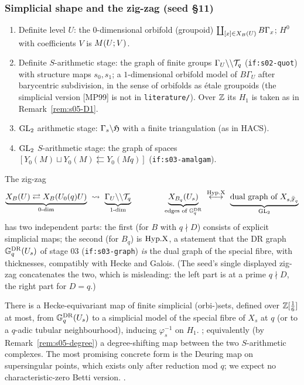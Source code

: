 \subsubsection{Simplicial shape and the zig-zag (seed \S11)}
\begin{definition}\label{def:s05-stages}
\begin{enumerate}[label=(\roman*)]
\item Definite level $U$: the $0$-dimensional orbifold (groupoid) $\coprod_{[x]\in X_B(U)}B\Gamma_x$; $H^0$ with coefficients $V$
  is $M(U;V)$.
\item Definite $S$-arithmetic stage: the graph of finite groups $\Gamma_U\backslash\backslash\mathcal{T}_q$ (\texttt{if:s02-quot}) with structure maps
  $s_0,s_1$; a $1$-dimensional orbifold model of $B\Gamma_U$ after barycentric subdivision, in the sense of orbifolds as étale
  groupoids  (the simplicial version [MP99] is not in \texttt{literature/}). Over $\mathbb{Z}$ its $H_1$ is taken as in Remark~\ref{rem:s05-D1}.
\item $\mathrm{GL}_2$ arithmetic stage: $\Gamma_s\backslash\mathfrak{H}$ with a finite triangulation (as in HACS).
\item $\mathrm{GL}_2$ $S$-arithmetic stage: the graph of spaces $[Y_0(M)\sqcup Y_0(M)\leftleftarrows Y_0(Mq)]$ (\texttt{if:s03-amalgam}).
\end{enumerate}
\end{definition}
The zig-zag
\[\underbrace{\XB{U}\rightleftarrows\XB{\Uzero{q}U}}_{\text{0-dim}}\ \leadsto\ \underbrace{\Gamma_U\quot\cT_q}_{\text{1-dim}}
\qquad\qquad \underbrace{\XBq{U_s}}_{\text{edges of }\GDR_q}\ \overset{\HypX}{\longleftrightarrow}\ \underbrace{\text{dual graph of }X_{s,\bar\F_q}}_{\GL_2}\]
has two independent parts: the first (for $B$ with $q\nmid D$) consists of explicit simplicial maps; the second (for $B_q$) is
$\mathrm{Hyp.X}$, a statement that the DR graph $\mathbb{G}^{\mathrm{DR}}_q(U_s)$ of stage 03 (\texttt{if:s03-graph}) \emph{is} the dual graph
of the special fibre, with thicknesses, compatibly with Hecke and Galois. (The seed's single displayed zig-zag concatenates the
two, which is misleading: the left part is at a prime $q\nmid D$, the right part for $D=q$.)

\begin{conjecture}\label{conj:s05-O2}
There is a Hecke-equivariant map of finite simplicial (orbi-)sets, defined over $\mathbb{Z}[\frac1{6}]$ at most, from $\mathbb{G}^{\mathrm{DR}}_q(U_s)$ to a
simplicial model of the special fibre of $X_s$ at $q$ (or to a $q$-adic tubular neighbourhood), inducing $\varphi_s^{-1}$ on $H_1$.
\stconj{}; equivalently (by Remark~\ref{rem:s05-degree}) a degree-shifting map between the two $S$-arithmetic complexes. The most
promising concrete form is the Deuring map on supersingular points, which exists only after reduction mod $q$; we expect no
characteristic-zero Betti version. \stopen.
\end{conjecture}


